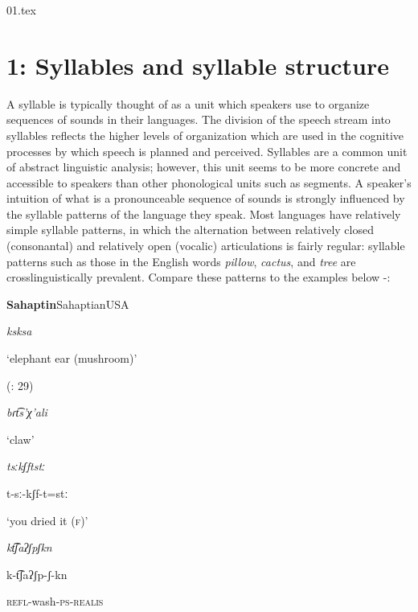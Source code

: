 01.tex
\chapter{1: Syllables and syllable structure}

  A syllable is typically thought of as a unit which speakers use to organize sequences of sounds in their languages. The division of the speech stream into syllables reflects the higher levels of organization which are used in the cognitive processes by which speech is planned and perceived. Syllables are a common unit of abstract linguistic analysis; however, this unit seems to be more concrete and accessible to speakers than other phonological units such as segments. A speaker’s intuition of what is a pronounceable sequence of sounds is strongly influenced by the syllable patterns of the language they speak. Most languages have relatively simple syllable patterns, in which the alternation between relatively closed (consonantal) and relatively open (vocalic) articulations is fairly regular: syllable patterns such as those in the English words \textit{pillow}, \textit{cactus}, and \textit{tree} are crosslinguistically prevalent. Compare these patterns to the examples below -:

\ea\label{ex:(1.1)}
 \textbf{Sahaptin}{Sahaptian}{USA}

\textit{ksksa}

\glt ‘elephant ear (mushroom)’

(\citealt{HargusBeavert2006}: 29)
\z

\ea\label{ex:(1.2)}

\textit{bɾt͡s’χ’ali}

\glt ‘claw’

\citep[204]{Butskhrikidze2002}

\z

\ea\label{ex:(1.3)}

\textit{tsːkʃftstː}

t-sː-kʃf-t=stː

\glt ‘you dried it (\textsc{f})’

\citep[332]{Ridouane2008}

\z

\ea\label{ex:(1.4)}

\textit{kt͡ʃaʔʃpʃkn}

k-t͡ʃaʔʃp-ʃ-kn

\textsc{refl}-wash-\textsc{ps-realis}

